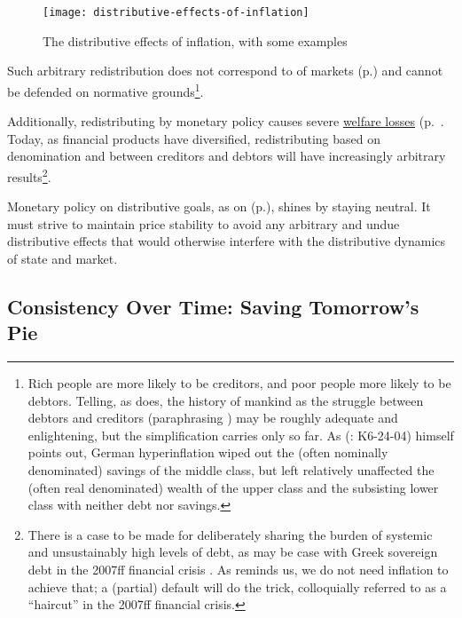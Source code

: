 \begin{figure}[htbp]
	\centering
	\texttt{[image: distributive-effects-of-inflation]}  
	\caption[Distributive Effects of Inflation]{The distributive effects of inflation, with some examples}
	\label{fig:distributive-effects-of-inflation}
\end{figure}

Such arbitrary redistribution does not correspond to  of markets  (p.\pageref{sec:inequality-dynamics}) and cannot be defended on normative grounds\footnote{
	Rich people are more likely to be creditors, and poor people more likely to be debtors. Telling, as \cite{Coggan2011} does, the history of mankind as the struggle between debtors and creditors (paraphrasing \citealt{Marx-1867-aa}) may be roughly adequate and enlightening, but the simplification carries only so far. As \citeauthor{Coggan2011}(\citeyear{Coggan2011}: K6-24-04) himself points out, German hyperinflation wiped out the (often nominally denominated) savings of the middle class, but left relatively unaffected the (often real denominated) wealth of the upper class and the subsisting lower class with neither debt nor savings.}. 
	
Additionally, redistributing by monetary policy causes severe \hyperref[sec:price-stability]{welfare losses} (p.~\pageref{sec:price-stability}. Today, as financial products have diversified, redistributing based on denomination and between creditors and debtors will have increasingly arbitrary results\footnote{
	There is a case to be made for deliberately sharing the burden of systemic and unsustainably high levels of debt, as may be case with Greek sovereign debt in the 2007ff financial crisis \citep{Coggan2011}. As \citeauthor{Coggan2011} reminds us, we do not need inflation to achieve that; a (partial) default will do the trick, colloquially referred to as a ``haircut'' in the 2007ff financial crisis.}.

Monetary policy on distributive goals, as on  (p.\pageref{sec:production}), shines by staying neutral. It must strive to maintain price stability to avoid any arbitrary and undue distributive effects that would otherwise interfere with the distributive dynamics of state and market.

\subsection[Consistency Over Time]{Consistency Over Time: Saving Tomorrow's Pie}\label{sec:time} 

